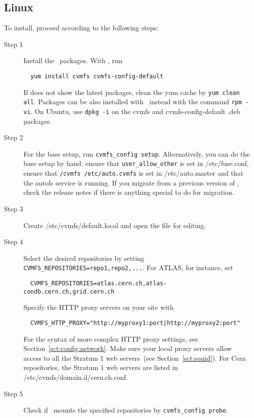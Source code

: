 \subsection{Linux}
To install, proceed according to the following steps:
\begin{description}
	\item[Step 1] Install the \cvmfs\ packages.  With , run
\begin{verbatim}
  yum install cvmfs cvmfs-config-default
\end{verbatim}
		If  does not show the latest packages, clean the yum cache by \texttt{yum clean all}.
		Packages can be also installed with \rpm\ instead with the command \texttt{rpm -vi}.
		On Ubuntu, use \texttt{dpkg -i} on the cvmfs and cvmfs-config-default .deb packages.
	\item[Step 2] For the base setup, run \texttt{cvmfs\_config setup}.
		Alternatively, you can do the base setup by hand: ensure that \texttt{user\_allow\_other} is set in /etc/fuse.conf, ensure that \texttt{/cvmfs /etc/auto.cvmfs} is set in /etc/auto.master and that the autofs service is running.
		If you migrate from a previous version of \cvmfs, check the release notes if there is anything special to do for migration.
	\item[Step 3] Create /etc/cvmfs/default.local and open the file for editing.
	\item[Step 4] Select the desired repositories by setting \texttt{CVMFS\_REPOSITORIES=repo1,repo2,...}.
		For ATLAS, for instance, set 
\begin{verbatim}
  CVMFS_REPOSITORIES=atlas.cern.ch,atlas-condb.cern.ch,grid.cern.ch
\end{verbatim}
		Specify the HTTP proxy servers on your site with
\begin{verbatim}
  CVMFS_HTTP_PROXY="http://myproxy1:port|http://myproxy2:port"
\end{verbatim}
		For the syntax of more complex HTTP proxy settings, see Section~\ref{sct:config:network}.
		Make sure your local proxy servers allow access to all the Stratum 1 web servers~(see Section~\ref{sct:squid}).
		For Cern repositories, the Stratum 1 web servers are listed in /etc/cvmfs/domain.d/cern.ch.conf.
	\item[Step 5] Check if \cvmfs\ mounts the specified repositories by \texttt{cvmfs\_config probe}.
\end{description}

